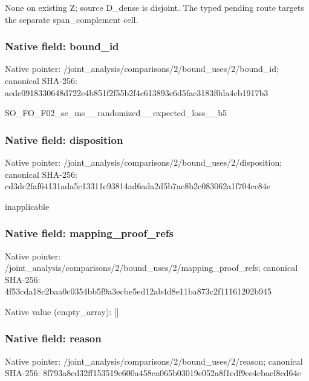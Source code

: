 \documentclass[10pt,a4paper]{article}
\begin{document}
\begingroup\raggedright\sloppy None on existing Z;\allowbreak{} source D\_\allowbreak{}dense is disjoint. The typed pending route targets the separate span\_\allowbreak{}complement cell.\par\endgroup

\subsubsection{Native field: bound\_\allowbreak{}id}
Native pointer: /joint\_\allowbreak{}analysis/comparisons/2/bound\_\allowbreak{}uses/2/bound\_\allowbreak{}id; canonical SHA-256: aede0918330648d722e4b851f2f55b2f4c613893e6d5fac3183f0da4cb1917b3

\begingroup\raggedright\sloppy SO\_\allowbreak{}FO\_\allowbreak{}F02\_\allowbreak{}sc\_\allowbreak{}ms\_\allowbreak{}\_\allowbreak{}randomized\_\allowbreak{}\_\allowbreak{}expected\_\allowbreak{}loss\_\allowbreak{}\_\allowbreak{}b5\par\endgroup

\subsubsection{Native field: disposition}
Native pointer: /joint\_\allowbreak{}analysis/comparisons/2/bound\_\allowbreak{}uses/2/disposition; canonical SHA-256: cd3dc2faf64131ada5c13311e93814ad6ada2d5b7ae8b2c083062a1f704cc84e

\begingroup\raggedright\sloppy inapplicable\par\endgroup

\subsubsection{Native field: mapping\_\allowbreak{}proof\_\allowbreak{}refs}
Native pointer: /joint\_\allowbreak{}analysis/comparisons/2/bound\_\allowbreak{}uses/2/mapping\_\allowbreak{}proof\_\allowbreak{}refs; canonical SHA-256: 4f53cda18c2baa0c0354bb5f9a3ecbe5ed12ab4d8e11ba873c2f11161202b945

Native value (empty\_\allowbreak{}array): []

\subsubsection{Native field: reason}
Native pointer: /joint\_\allowbreak{}analysis/comparisons/2/bound\_\allowbreak{}uses/2/reason; canonical SHA-256: 8f793a8ed32ff153519e600a458ea065b03019e052a8f1edf9ee4cbaef8cd64e
\end{document}
